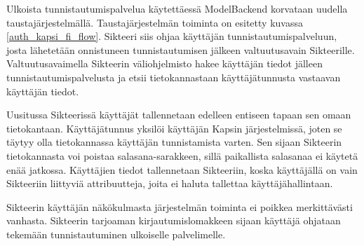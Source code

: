 Ulkoista tunnistautumispalvelua käytettäessä ModelBackend korvataan uudella taustajärjestelmällä. Taustajärjestelmän toiminta on esitetty kuvassa \ref{auth_kapsi_fi_flow}. Sikteeri siis ohjaa käyttäjän tunnistautumispalveluun, josta lähetetään onnistuneen tunnistautumisen jälkeen valtuutusavain Sikteerille. Valtuutusavaimella Sikteerin väliohjelmisto hakee käyttäjän tiedot jälleen tunnistautumispalvelusta ja etsii tietokannastaan käyttäjätunnusta vastaavan käyttäjän tiedot.

Uusitussa Sikteerissä käyttäjät tallennetaan edelleen entiseen tapaan sen omaan tietokantaan. Käyttäjätunnus yksilöi käyttäjän Kapsin järjestelmissä, joten se täytyy olla tietokannassa käyttäjän tunnistamista varten. Sen sijaan Sikteerin tietokannasta voi poistaa salasana-sarakkeen, sillä paikallista salasanaa ei käytetä enää jatkossa. Käyttäjien tiedot tallennetaan Sikteeriin, koska käyttäjällä on vain Sikteeriin liittyviä attribuutteja, joita ei haluta tallettaa käyttäjähallintaan.

Sikteerin käyttäjän näkökulmasta järjestelmän toiminta ei poikkea merkittävästi vanhasta. Sikteerin tarjoaman kirjautumislomakkeen sijaan käyttäjä ohjataan tekemään tunnistautuminen ulkoiselle palvelimelle.